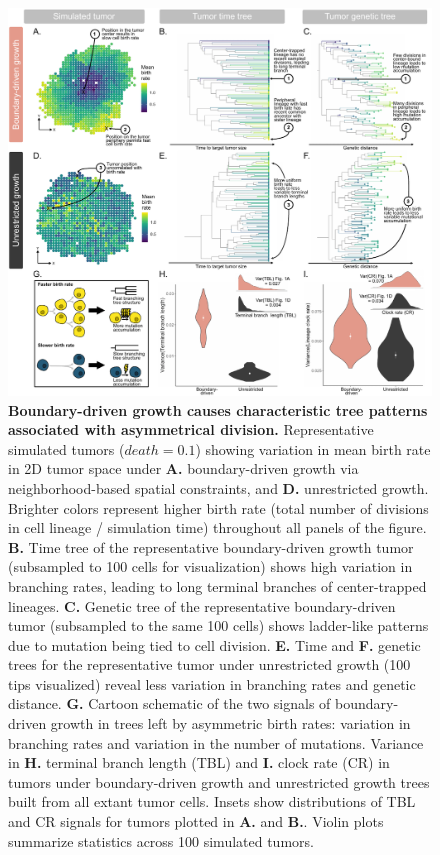 \documentclass[12pt]{elife_based}
\begin{document}
\begin{figure}
    \includegraphics[width=0.95\linewidth]{figures/fig1_2022_08_01.pdf}
    \caption{\textbf{Boundary-driven growth causes characteristic tree patterns associated with asymmetrical division.} Representative simulated tumors ($death = 0.1$) showing variation in mean birth rate in 2D tumor space under \textbf{A.} boundary-driven growth via neighborhood-based spatial constraints, and \textbf{D.} unrestricted growth. Brighter colors represent higher birth rate (total number of divisions in cell lineage / simulation time) throughout all panels of the figure. \textbf{B.} Time tree of the representative boundary-driven growth tumor (subsampled to 100 cells for visualization) shows high variation in branching rates, leading to long terminal branches of center-trapped lineages. \textbf{C.} Genetic tree of the representative boundary-driven tumor (subsampled to the same 100 cells) shows ladder-like patterns due to mutation being tied to cell division. \textbf{E.} Time and \textbf{F.} genetic trees for the representative tumor under unrestricted growth (100 tips visualized) reveal less variation in branching rates and genetic distance. \textbf{G.} Cartoon schematic of the two signals of boundary-driven growth in trees left by asymmetric birth rates: variation in branching rates and variation in the number of mutations. Variance in \textbf{H.} terminal branch length (TBL) and \textbf{I.} clock rate (CR) in tumors under boundary-driven growth and unrestricted growth trees built from all extant tumor cells. Insets show distributions of TBL and CR signals for tumors plotted in \textbf{A.} and \textbf{B.}. Violin plots summarize statistics across 100 simulated tumors.}

    \label{fig:f1}
\end{figure}
\end{document}
